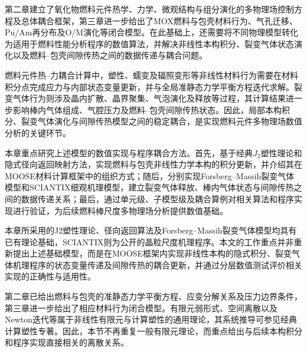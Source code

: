

第二章建立了氧化物燃料元件热学、力学、微观结构与组分演化的多物理场控制方程及总体耦合框架，第三章进一步给出了MOX燃料与包壳材料行为、气孔迁移、Pu/Am再分布及O/M演化等闭合模型。在此基础上，还需要将不同物理模型转化为适用于燃料性能分析程序的数值算法，并解决非线性本构积分、裂变气体状态演化以及燃料--包壳间隙传热之间的数据传递与耦合问题。

燃料元件热--力耦合计算中，塑性、蠕变及辐照变形等非线性材料行为需要在材料积分点完成应力与内部状态变量更新，并与全局准静态力学平衡方程迭代求解。裂变气体行为则涉及晶内扩散、晶界聚集、气泡演化及释放等过程，其计算结果进一步影响棒内气体组成、气腔压力及燃料--包壳间隙传热状态。因此，局部本构积分、裂变气体演化与间隙传热模型之间的稳定耦合，是实现燃料元件多物理场数值分析的关键环节。

本章重点研究上述模型的数值实现与程序耦合方法。首先，基于经典$J_2$塑性理论和隐式径向返回映射方法，实现燃料与包壳非线性力学本构的积分更新，并介绍其在MOOSE材料计算框架中的组织方式；随后，分别实现Forsberg--Massih裂变气体模型和SCIANTIX细观机理模型，建立裂变气体释放、棒内气体状态与间隙传热之间的数据传递关系；最后，通过单元级、子模型级及耦合算例对相关算法和程序实现进行验证，为后续燃料棒尺度多物理场分析提供数值基础。

本章所采用的J2塑性理论、径向返回算法及Forsberg–Massih裂变气体模型均具有已有理论基础，SCIANTIX则为公开的晶粒尺度机理程序。本文的工作重点并非重新提出上述基础模型，而是在MOOSE框架内实现非线性本构的隐式积分、裂变气体机理程序的状态变量传递及间隙传热的耦合更新，并通过分层数值测试评价相关实现的正确性与适用性。

第二章已给出燃料与包壳的准静态力学平衡方程、应变分解关系及压力边界条件，第三章进一步给出了相应材料行为闭合模型。有限元弱形式、空间离散以及Newton迭代等属于非线性有限元与计算塑性的通用理论，其系统推导可参见经典计算塑性专著\cite{dunneIntroductionComputationalPlasticity2005}。因此，本节不再重复一般有限元理论，而重点给出与后续本构积分和程序实现直接相关的离散关系。

